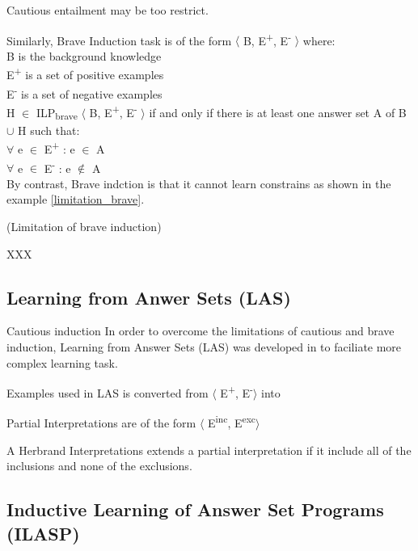 \documentclass[12pt,twoside]{report}
\begin{document}
Cautious entailment may be too restrict.

Similarly, Brave Induction task is of the form $\langle$ B, E\textsuperscript{+}, E\textsuperscript{-} $\rangle$ where: \\
B is the background knowledge \\
E\textsuperscript{+} is a set of positive examples \\
E\textsuperscript{-} is a set of negative examples \\

 H $\in$ ILP\textsubscript{brave} $\langle$ B, E\textsuperscript{+}, E\textsuperscript{-} $\rangle$ if and only if there is at least one answer set A of B $\cup$ H such that: \\
$\forall$ e $\in$ E\textsuperscript{+} : e $\in$ A \\
$\forall$ e $\in$ E\textsuperscript{-} : e $\notin$ A \\


By contrast, Brave indction is that it cannot learn constrains as shown in the example \ref{limitation_brave}.

\begin{examp} (Limitation of brave induction)

XXX
\end{examp}
\label{limitation_brave}

\subsection{Learning from Anwer Sets (LAS)}

Cautious induction In order to overcome the limitations of cautious and brave induction,
Learning from Answer Sets (LAS) was developed in \cite{Law2014} to faciliate more complex learning task.

Examples used in LAS is converted from $\langle$ E\textsuperscript{+}, E\textsuperscript{-}$\rangle$ into

Partial Interpretations are of the form $\langle$ E\textsuperscript{inc}, E\textsuperscript{exc}$\rangle$

A Herbrand Interpretations extends a partial interpretation if it include all of the inclusions and none of the exclusions.

\subsection{Inductive Learning of Answer Set Programs (ILASP)}
\end{document}
